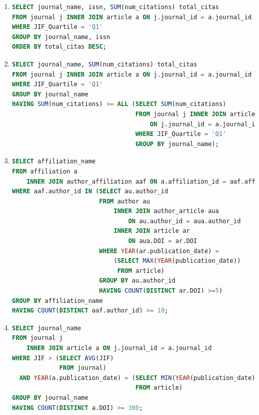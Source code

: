 \documentclass{db-practice}
\begin{document}
\begin{enumerate}
\item
\begin{lstlisting}[language=SQL]
SELECT journal_name, issn, SUM(num_citations) total_citas
FROM journal j INNER JOIN article a ON j.journal_id = a.journal_id
WHERE JIF_Quartile = 'Q1'
GROUP BY journal_name, issn
ORDER BY total_citas DESC;
\end{lstlisting}

\item
\begin{lstlisting}[language=SQL]
SELECT journal_name, SUM(num_citations) total_citas
FROM journal j INNER JOIN article a ON j.journal_id = a.journal_id
WHERE JIF_Quartile = 'Q1'
GROUP BY journal_name
HAVING SUM(num_citations) >= ALL (SELECT SUM(num_citations)
                                  FROM journal j INNER JOIN article a 
                                      ON j.journal_id = a.journal_id
                                  WHERE JIF_Quartile = 'Q1'
                                  GROUP BY journal_name);
\end{lstlisting}

\item
\begin{lstlisting}[language=SQL]
SELECT affiliation_name
FROM affiliation a 
    INNER JOIN author_affiliation aaf ON a.affiliation_id = aaf.affiliation_id
WHERE aaf.author_id IN (SELECT au.author_id
                        FROM author au 
                            INNER JOIN author_article aua 
                                ON au.author_id = aua.author_id
                            INNER JOIN article ar 
                                ON aua.DOI = ar.DOI
                        WHERE YEAR(ar.publication_date) = 
                            (SELECT MAX(YEAR(publication_date))
                             FROM article)
                        GROUP BY au.author_id 
                        HAVING COUNT(DISTINCT ar.DOI) >=5)     
GROUP BY affiliation_name
HAVING COUNT(DISTINCT aaf.author_id) >= 10;
\end{lstlisting}

\item
\begin{lstlisting}[language=SQL]
SELECT journal_name
FROM journal j 
    INNER JOIN article a ON j.journal_id = a.journal_id
WHERE JIF > (SELECT AVG(JIF)
             FROM journal)
  AND YEAR(a.publication_date) = (SELECT MIN(YEAR(publication_date))
                                  FROM article)
GROUP BY journal_name
HAVING COUNT(DISTINCT a.DOI) >= 300;
\end{lstlisting}


\end{enumerate}
\end{document}
